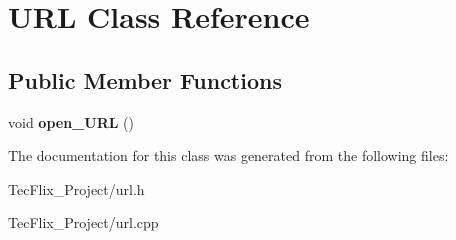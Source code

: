 \hypertarget{classURL}{}\section{U\+RL Class Reference}
\label{classURL}
\subsection*{Public Member Functions}
\begin{DoxyCompactItemize}
\item 
\mbox{\label{classURL_a8146dd2468294e24e63908fc1dba611b}} 
void {\bfseries open\+\_\+\+U\+RL} ()
\end{DoxyCompactItemize}


The documentation for this class was generated from the following files\+:\begin{DoxyCompactItemize}
\item 
Tec\+Flix\+\_\+\+Project/url.\+h\item 
Tec\+Flix\+\_\+\+Project/url.\+cpp\end{DoxyCompactItemize}
